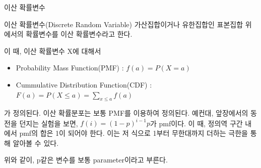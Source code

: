 \documentclass{beamer}
\begin{document}
\begin{frame}{이산 확률변수}


\begin{block}{이산 확률변수(Discrete Random Variable)}
가산집합이거나 유한집합인 표본집합 위에서의 확률변수를 이산 확률변수라고 한다. 
\end{block}

이 때, 이산 확률변수 X에 대해서 

\begin{itemize} 
\item Probability Mass Function(PMF) : $f(a) = P(X=a)$
\item Cummulative Distribution Function(CDF) : $F(a) = P(X \leq a) = \sum_{x \leq a} f(a)$
\end{itemize}

가 정의된다. 이산 확률분포는 보통 PMF를 이용하여 정의된다. 예컨대, 앞장에서의 동전을 던지는 실험을 보면, $f(i) = (1-p)^{i-1}p$가 pmf이다. 이 때, 정의역 구간 내에서 pmf의 합은 1이 되어야 한다. 이는 저 식으로 1부터 무한대까지 더하는 극한을 통해 알아볼 수 있다. 

위와 같이, p같은 변수를 보통 parameter이라고 부른다. 


\end{frame}
\end{document}
